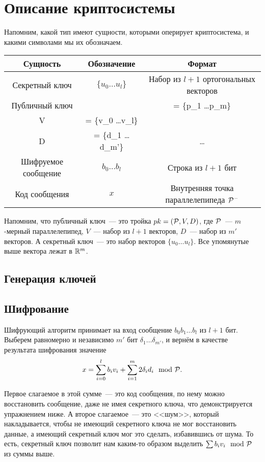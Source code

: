 \documentclass[oneside, a4paper]{article}
\theoremstyle{plain}
\theoremstyle{defn}
\theoremstyle{remark}
\newcommand\PP{\ensuremath \mathcal P}
\newcommand\R{\ensuremath \mathbb R}
\begin{document}
\section{Описание криптосистемы}

Напомним, какой тип имеют сущности, которыми оперирует криптосистема, и какими
символами мы их обозначаем.

\begin{table}[h]
\centering
\begin{tabular}{c | c | c}
Сущность & Обозначение & Формат \\
\hline
Секретный ключ & $\{u_0 \dots u_l\}$ & Набор из $l+1$ ортогональных векторов \\
Публичный ключ
&
\parbox{3cm}{
\[
\begin{aligned}
\PP &= \{p_1 \dots p_m\} \\
V &= \{v_0 \dots v_l\} \\
D &= \{d_1 \dots d_{m'}\}
\end{aligned}
\]
}
& \dots \\
Шифруемое сообщение & $b_0 \dots b_l$ & Строка из $l+1$ бит \\
Код сообщения & $x$ & Внутренняя точка параллелепипеда $\PP^-$ \\
\end{tabular}
\end{table}

Напомним, что публичный ключ~--- это тройка $pk = (\PP, V, D)$, где $\PP$~---
$m$-мерный параллелепипед, $V$~--- набор из $l+1$ векторов, $D$~--- набор из
$m'$ векторов. А секретный ключ~--- это набор векторов $\{u_0 \dots u_l\}$. Все
упомянутые выше вектора лежат в $\R^m$.

\subsection{Генерация ключей}

\subsection{Шифрование} Шифрующий алгоритм принимает на вход сообщение $b_0 b_1 \dots
b_l$ из $l+1$ бит. Выберем равномерно и независимо $m'$ бит $\delta_1 \dots
\delta_{m'}$, и вернём в качестве результата шифрования значение
\[
x = \sum_{i = 0}^l b_i v_i + \sum_{i = 1}^m 2 \delta_i d_i \mod \PP.
\]

Первое слагаемое в этой сумме~--- это код сообщения, по нему можно восстановить
сообщение, даже не имея секретного ключа, что демонстрируется упражнением ниже.
А второе слагаемое~--- это <<шум>>, который накладывается, чтобы не
имеющий секретного ключа не мог восстановить данные, а имеющий секретный
ключ мог это сделать, избавившись от шума. То есть, секретный ключ позволит нам
каким-то образом выделить $\sum b_i v_i \mod \PP$ из суммы выше.
\end{document}
